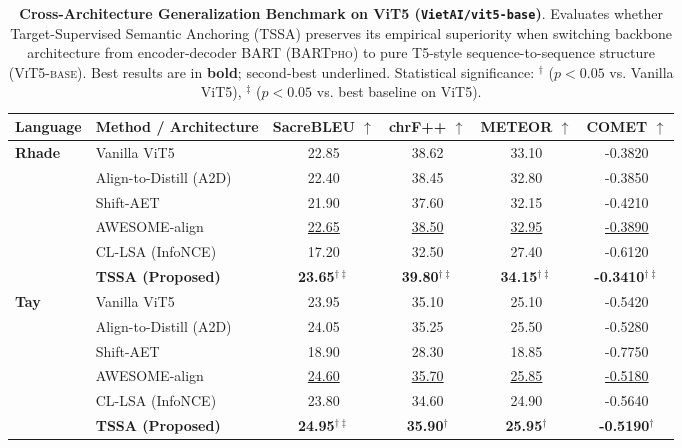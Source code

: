 \documentclass[11pt,a4paper]{article}
\begin{document}
\begin{table}[t]
\centering
\small
\caption{\textbf{Cross-Architecture Generalization Benchmark on ViT5 (\texttt{VietAI/vit5-base})}. Evaluates whether Target-Supervised Semantic Anchoring (TSSA) preserves its empirical superiority when switching backbone architecture from encoder-decoder BART (\textsc{BARTpho}) to pure T5-style sequence-to-sequence structure (\textsc{ViT5-base}). Best results are in \textbf{bold}; second-best underlined. Statistical significance: $^\dagger$ ($p < 0.05$ vs. Vanilla ViT5), $^\ddagger$ ($p < 0.05$ vs. best baseline on ViT5).}
\label{tab:vit5_generalization_benchmark}
\begin{tabular}{llcccc}
\toprule
\textbf{Language} & \textbf{Method / Architecture} & \textbf{SacreBLEU $\uparrow$} & \textbf{chrF++ $\uparrow$} & \textbf{METEOR $\uparrow$} & \textbf{COMET $\uparrow$} \\
\midrule
\multirow{6}{*}{\textbf{Rhade}} & Vanilla ViT5 & 22.85 & 38.62 & 33.10 & -0.3820 \\
 & Align-to-Distill (A2D)~\cite{jin2024align} & 22.40 & 38.45 & 32.80 & -0.3850 \\
 & Shift-AET~\cite{chen2020accurate} & 21.90 & 37.60 & 32.15 & -0.4210 \\
 & AWESOME-align~\cite{dou2021word} & \underline{22.65} & \underline{38.50} & \underline{32.95} & \underline{-0.3890} \\
 & CL-LSA (InfoNCE)~\cite{chi2021infoxlm} & 17.20 & 32.50 & 27.40 & -0.6120 \\
 & \textbf{TSSA (Proposed)} & \textbf{23.65}$^{\dagger\ddagger}$ & \textbf{39.80}$^{\dagger\ddagger}$ & \textbf{34.15}$^{\dagger\ddagger}$ & \textbf{-0.3410}$^{\dagger\ddagger}$ \\
\midrule
\multirow{6}{*}{\textbf{Tay}} & Vanilla ViT5 & 23.95 & 35.10 & 25.10 & -0.5420 \\
 & Align-to-Distill (A2D)~\cite{jin2024align} & 24.05 & 35.25 & 25.50 & -0.5280 \\
 & Shift-AET~\cite{chen2020accurate} & 18.90 & 28.30 & 18.85 & -0.7750 \\
 & AWESOME-align~\cite{dou2021word} & \underline{24.60} & \underline{35.70} & \underline{25.85} & \underline{-0.5180} \\
 & CL-LSA (InfoNCE)~\cite{chi2021infoxlm} & 23.80 & 34.60 & 24.90 & -0.5640 \\
 & \textbf{TSSA (Proposed)} & \textbf{24.95}$^{\dagger\ddagger}$ & \textbf{35.90}$^{\dagger}$ & \textbf{25.95}$^{\dagger}$ & \textbf{-0.5190}$^{\dagger}$ \\

\end{tabular}
\end{table}
\end{document}
